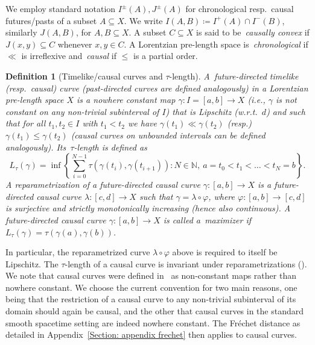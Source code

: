 \documentclass[a4paper,11pt]{article}
\numberwithin{equation}{section}
\theoremstyle{plain}
\newtheorem{Definition}{Definition}[section]
\theoremstyle{definition}
\newcommand{\N}{\mathbb N}
\begin{document}
We employ standard notation $I^\pm(A), J^\pm(A)$ for chronological resp.\ causal futures/pasts of a subset $A \subseteq X$. We write $I(A,B) \coloneqq I^+(A) \cap I^-(B)$, similarly $J(A,B)$, for $A, B \subseteq X$. A subset $C \subseteq X$ is said to be~\emph{causally convex\/} if $J(x,y) \subseteq C$ whenever $x,y \in C$. A Lorentzian pre-length space is~\emph{chronological\/} if $\ll$ is irreflexive and~\emph{causal\/} if $\leq$ is a partial order.

\begin{Definition}[Timelike/causal curves and $\tau$-length]
\label{def:TLcausalcurves}
A~\emph{future-directed timelike (resp.\ causal) curve\/} (past-directed curves are defined analogously) in a Lorentzian pre-length space $X$ is a nowhere constant map $\gamma \colon I=[a,b]\to X$ (i.e., $\gamma$ is not constant on any non-trivial subinterval of $I$) that
is Lipschitz (w.r.t.\ $d$) and such that for all $t_1, t_2 \in I$ with $t_1<t_2$ we have $\gamma(t_1) \ll \gamma(t_2)$ (resp.) $\gamma(t_1)\le \gamma(t_2)$ (causal curves on unbounded intervals can be defined analogously). Its~\emph{$\tau$-length\/} is defined as 
\[
L_\tau(\gamma) = \inf \left\{ \sum_{i=0}^{N-1} \tau(\gamma(t_i),\gamma(t_{i+1})) \colon 
N\in \N,\ a=t_0 < t_1 < \dots < t_N = b \right\}.
\]
A reparametrization of a future-directed causal curve $\gamma \colon [a,b] \to X$ is a future-directed causal curve $\lambda \colon [c,d] \to X$ such that $\gamma=\lambda\circ \varphi$, where $\varphi \colon [a,b]\to [c,d]$ is surjective and strictly monotonically increasing (hence also continuous). A future-directed causal curve $\gamma \colon [a,b] \to X$ is called a~\emph{maximizer\/} if $L_\tau(\gamma) = \tau(\gamma(a),\gamma(b))$.
\end{Definition}

In particular, the reparametrized curve $\lambda\circ\varphi$ above is required to itself be Lipschitz. The $\tau$-length of a causal curve is invariant under reparametrizations (\cite[Lem.\ 2.18]{kunzinger2018lorentzian}). We note that causal curves were defined in~\cite{kunzinger2018lorentzian} as non-constant maps rather than nowhere constant. We choose the current convention for two main reasons, one being that the restriction of a causal curve to any non-trivial subinterval of its domain should again be causal, and the other that causal curves in the standard smooth spacetime setting are indeed nowhere constant. The Fr\'{e}chet distance as detailed in Appendix~\ref{Section: appendix frechet} then applies to causal curves.
\end{document}
